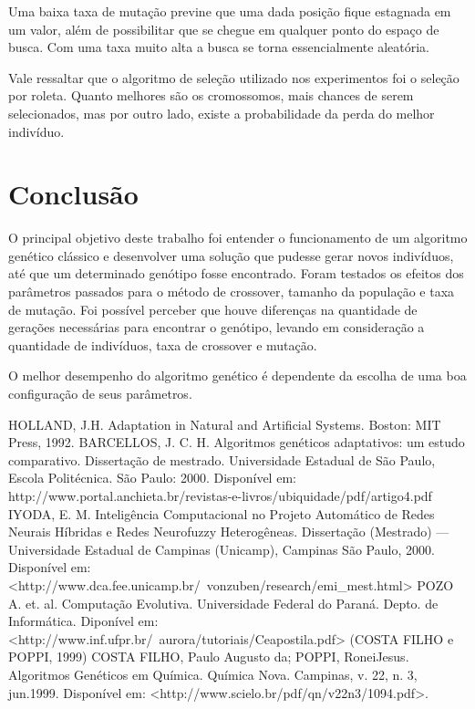 \documentclass[conference]{IEEEtran}
\begin{document}
Uma baixa taxa de mutação previne que uma dada posição fique estagnada em um valor, além de possibilitar que se chegue em qualquer ponto do espaço de busca. Com uma taxa muito alta a busca se torna essencialmente aleatória.
    
Vale ressaltar que o algoritmo de seleção utilizado nos experimentos foi o seleção por roleta. Quanto melhores são os cromossomos, mais chances de serem selecionados, mas por outro lado, existe a probabilidade da perda do melhor indivíduo.

\section*{Conclusão}

O principal objetivo deste trabalho foi entender o funcionamento de um algoritmo genético clássico e desenvolver uma solução que pudesse gerar novos indivíduos, até que um determinado genótipo fosse encontrado. Foram testados os efeitos dos parâmetros passados para o método de crossover, tamanho da população e taxa de mutação. Foi possível perceber que houve diferenças na quantidade de gerações necessárias para encontrar o genótipo, levando em consideração a quantidade de indivíduos, taxa de crossover e mutação.

O melhor desempenho do algoritmo genético é dependente da escolha de uma boa configuração de seus parâmetros.


\begin{thebibliography}{00}

 HOLLAND, J.H. Adaptation in Natural and Artificial Systems. Boston: MIT Press, 1992.
 BARCELLOS,  J.  C.  H. Algoritmos  genéticos  adaptativos:  um  estudo  comparativo. Dissertação  de mestrado. Universidade Estadual de São Paulo, Escola  Politécnica. São Paulo: 2000. Disponível em: http://www.portal.anchieta.br/revistas-e-livros/ubiquidade/pdf/artigo4.pdf
 IYODA, E. M. Inteligência Computacional no Projeto Automático de Redes Neurais Híbridas e  Redes  Neurofuzzy  Heterogêneas. Dissertação  (Mestrado)  —   Universidade  Estadual  de Campinas  (Unicamp),  Campinas São  Paulo,  2000.  Disponível  em: <http://www.dca.fee.unicamp.br/~vonzuben/research/emi\_mest.html>
 POZO A. et. al. Computação Evolutiva. Universidade Federal do Paraná. Depto. de Informática. Diponível em: <http://www.inf.ufpr.br/~aurora/tutoriais/Ceapostila.pdf>
 (COSTA  FILHO  e POPPI,  1999) COSTA  FILHO, Paulo  Augusto  da;  POPPI,  RoneiJesus. Algoritmos  Genéticos em Química.  Química Nova. Campinas,  v. 22,  n.  3, jun.1999.  Disponível  em:  <http://www.scielo.br/pdf/qn/v22n3/1094.pdf>.
\end{thebibliography}
\vspace{12pt}
\end{document}
